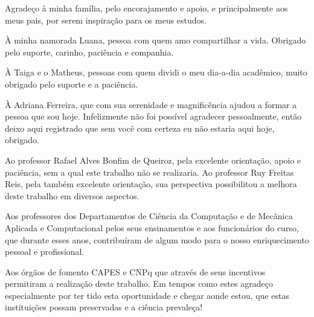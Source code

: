 \documentclass[msc,divps,pdftex]{mmc}
\begin{document}
\begin{agradecimentos}
	
	Agradeço à minha família, pelo encorajamento e apoio, e principalmente aos meus pais, por serem inspiração para os meus estudos.
	
	À minha namorada Luana, pessoa com quem amo compartilhar a vida. Obrigado pelo suporte, carinho, paciência e companhia.
	
	À Taiga e o Matheus, pessoas com quem dividi o meu dia-a-dia acadêmico, muito obrigado pelo suporte e a paciência.
	
	À Adriana Ferreira, que com sua serenidade e magnificência ajudou a formar a pessoa que sou hoje. Infelizmente não foi possível agradecer pessoalmente, então deixo aqui registrado que sem você com certeza eu não estaria aqui hoje, obrigado.
	
	Ao professor Rafael Alves Bonfim de Queiroz, pela excelente orientação, apoio e paci\^encia, sem a qual este trabalho n\~ao se realizaria. Ao professor Ruy Freitas Reis, pela também excelente orientação, sua perspectiva possibilitou a melhora deste trabalho em diversos aspectos.
	
	Aos professores dos Departamentos de Ci\^encia da Computa\c{c}\~ao e de Mecânica Aplicada e Computacional pelos seus ensinamentos e aos funcion\'arios do curso, que durante esses anos,
	contribu\'iram de algum modo para o nosso enriquecimento pessoal e
	profissional.
	
	Aos órgãos de fomento CAPES e CNPq que através de seus incentivos permitiram a realização deste trabalho. Em tempos como estes agradeço especialmente por ter tido esta oportunidade e chegar aonde estou, que estas instituições possam preservadas e a ciência prevaleça!
	
\end{agradecimentos}

\end{document}
